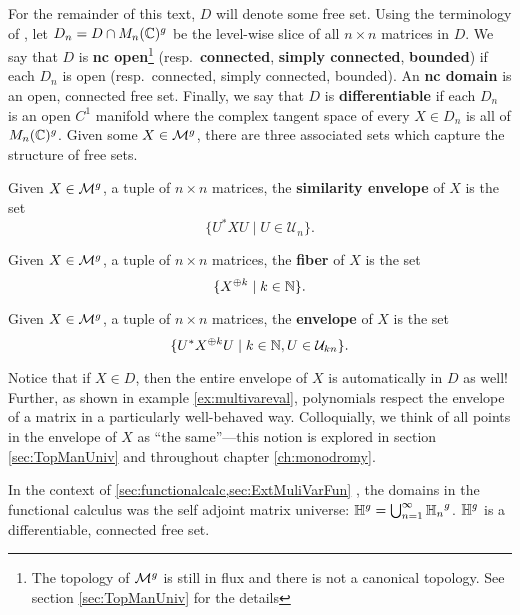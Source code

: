 For the remainder of this text, \(D\) will denote some free set. Using the
terminology of \cite{pascoeFreeNoncommutativePrincipal2020}, let
\(D_n = D \cap M_n(\mathbb{C})^g\) be the level-wise slice of all \(n \times n\)
matrices in \(D\). We say that \(D\) is \textbf{nc open}\footnote{The topology of \(\mathcal{M}^g\)
  is still in flux and there is not a canonical topology. See section \ref{sec:TopManUniv} for
  the details } (resp.\ \textbf{connected}, \textbf{simply connected}, \textbf{bounded}) if each \(D_n\) is open
(resp.\ connected, simply connected, bounded). An \textbf{nc domain} is an open,
connected free set. Finally, we say that \(D\) is
\textbf{differentiable} if each \(D_n\) is an open \(C^1\) manifold where the
complex tangent space of every \(X \in D_n\) is all of \(M_n(\mathbb{C})^g\).
Given some \(X \in \mathcal{M}^{g} \), there are three associated sets which capture the
structure of free sets.

\begin{definition}%
\label{def:semenv}
  Given \(X \in \mathcal{M}^{g} \), a tuple of \(n \times n\) matrices, the
  \textbf{similarity envelope} of \(X\) is the set
  \[
    \{U^* X U \mid  U \in \mathcal{U}_n\}.
  \]
\end{definition}

\begin{definition}[Fiber]%
\label{def:fiber}
  Given \(X \in \mathcal{M}^{g} \), a tuple of \(n \times n\) matrices, the
  \textbf{fiber} of \(X\) is the set
  \[
    \{X^{\oplus k} \mid  k \in \mathbb{N} \}.
  \]
\end{definition}

\begin{definition}[Envelope]%
\label{def:env}
  Given \(X \in \mathcal{M}^{g} \), a tuple of \(n \times n\) matrices, the
  \textbf{envelope} of \(X\) is the set
  \[
    \{ U^* X^{\oplus k} U \mid k \in \mathbb{N}, U \in \mathcal{U}_{kn} \}.
  \]
\end{definition}
Notice that if \(X \in D\), then the entire envelope of \(X\) is automatically
in \(D\) as well! Further, as shown in example \ref{ex:multivareval},
polynomials respect the envelope of a matrix in a particularly well-behaved way.
Colloquially, we think of all points in the envelope of \(X\) as ``the
same''---this notion is explored in section \ref{sec:TopManUniv} and throughout
chapter \ref{ch:monodromy}.

In the context of \cref{sec:functionalcalc,sec:ExtMuliVarFun}
%
, the domains in the functional calculus was the self adjoint matrix universe:
\(\mathbb{H}^g = \bigcup_{n=1}^{\infty} {\mathbb{H}_n}^g\). \(\mathbb{H} ^g\) is a differentiable, connected
free set.

